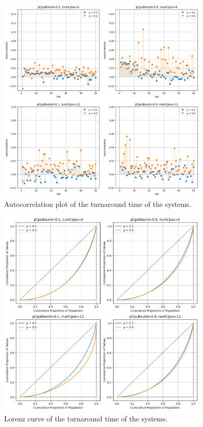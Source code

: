 \begin{figure}[H]
    \captionsetup{type=figure}
    \centering
    \includegraphics[width=0.9\textwidth]{./images/04/sjf/turn/autocorrelation.png}
    \caption{Autocorrelation plot of the turnaround time of the systems.}
    \label{fig:sjfTurnAutocorrelation}
\end{figure}

\begin{figure}[H]
    \captionsetup{type=figure}
    \centering
    \includegraphics[width=0.9\textwidth]{./images/04/sjf/turn/lorenz.png}
    \caption{Lorenz curve of the turnaround time of the systems.}
    \label{fig:sjfTurnLorenz}
\end{figure}


